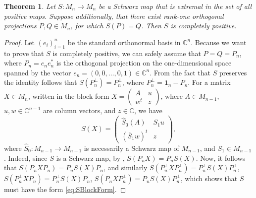 \documentclass[12pt]{article}
\theoremstyle{plain}
\newtheorem{theorem}{Theorem}
\theoremstyle{definition}
\theoremstyle{remark}
\numberwithin{equation}{section}
\begin{document}
\begin{theorem}
\label{thm:ExtremalSchwarz}
Let $S: M_{n} \rightarrow M_{n}$ be a Schwarz map that is extremal in the set
of all positive maps.
Suppose additionally, that there exist
rank-one orthogonal projections $P, Q \in M_{n}$, for which $S(P) = Q$.
Then $S$ is completely positive. 
\end{theorem}

\begin{proof}
Let $(e_{i})_{i=1}^{n}$ be the standard orthonormal basis in $\mathbb{C}^{n}$.  
Because we want to prove that $S$ is completely positive,
we can safely assume that $P = Q = P_{n}$,
where $P_{n} = e_{n} e_{n}^{*}$ is the orthogonal projection on the one-dimensional space
spanned by the vector $e_{n} = (0,0,\ldots,0,1) \in \mathbb{C}^{n}$. 
From the fact that $S$ preserves the identity follows that
$S(P_{n}^{\perp}) = P_{n}^{\perp}$,
where $P_{n}^{\perp} = \mathbf{1}_{n} - P_{n}$. 
For a matrix $X \in M_{n}$,
written in the block form
$X = \left( \begin{smallmatrix} A & u \\ w^{t} & z \end{smallmatrix} \right)$,
where $A \in M_{n-1}$, $u, w \in \mathbb{C}^{n-1}$ are column vectors,
and $z \in \mathbb{C}$, we have
\begin{equation}
\label{eq:SBlockForm}
    S (X) = \begin{pmatrix}
        \hat{S}_{0}(A) & S_{1} u \\
        (\overline{S}_{1} w)^{t} & z
    \end{pmatrix},
\end{equation}
where $\hat{S}_{0}: M_{n-1} \rightarrow M_{n-1}$ is necessarily a Schwarz map
of $M_{n-1}$, and $S_{1} \in M_{n-1}$.
Indeed, 
since $S$ is a Schwarz map, 
by \cite[Proposition 2.1.5]{stormer2012positive},
$S(P_{n} X) = P_{n} S(X)$.
Now, it follows that
$S(P_{n} X P_{n}) = P_{n} S(X) P_{n}$,
and similarly $S(P_{n}^{\perp} X P_{n}^{\perp}) = P_{n}^{\perp} S(X) P_{n}^{\perp}$,
$S(P_{n}^{\perp} X P_{n}) = P_{n}^{\perp} S(X) P_{n}$,
$S(P_{n} X P_{n}^{\perp}) = P_{n} S(X) P_{n}^{\perp}$,
which shows that $S$ must have the form \eqref{eq:SBlockForm}.


\end{proof}
\end{document}
